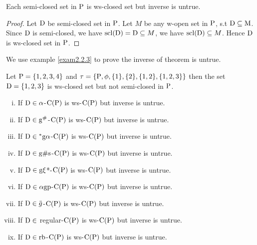 \begin{thm}\label{thm2.2.2}
Each semi-closed set in $\mathrm{P}$ is ws-closed set but inverse is untrue.
\end{thm}

\begin{proof}
Let $\mathrm{D}$ be semi-closed set in $\mathrm{P}$. Let $M$ be any w-open set in $\mathrm{P}$, s.t $\mathrm{D}\subseteq \mathrm{M}$. Since $\mathrm{D}$ is semi-closed, we have $\mathrm{scl}(\mathrm{D}) = \mathrm{D} \subseteq M$, we have  $\mathrm{scl}(\mathrm{D}) \subseteq M$.   Hence $\mathrm{D}$ is ws-closed set in $\mathrm{P}$.
\end{proof}

We use example \ref{exam2.2.3} to prove the inverse of  theorem is untrue. 

\begin{exm}\label{exam2.2.3}
Let $\mathrm{P}= \{1, 2, 3, 4\}$ and  $\tau= \{\mathrm{P}, \phi, \{1\}, \{2\},\{1, 2\}, \{1, 2, 3\}\}$ then the set $\mathrm{D}= \{1,2,3\}$ is ws-closed set but not semi-closed in $\mathrm{P}$.  
\end{exm}

\begin{thm}\label{thm2.2.4}
\begin{enumerate}[(i)]
\item If $\mathrm{D}\in\alpha$-$\mathrm{C}(\mathrm{P})$ is ws-$\mathrm{C}(\mathrm{P})$ but inverse is untrue.

\item If $\mathrm{D}\in \mathrm{g}^{\#}$-$\mathrm{C}(\mathrm{P})$ is ws-$\mathrm{C}(\mathrm{P})$ but inverse is untrue.

\item If $\mathrm{D}\in {}^{*}\mathrm{g}\alpha$-$\mathrm{C}(\mathrm{P})$ is ws-$\mathrm{C}(\mathrm{P})$ but inverse is untrue.

\item If $\mathrm{D}\in \mathrm{g}\# \mathrm{s}$-$\mathrm{C}(\mathrm{P})$ is ws-$\mathrm{C}(\mathrm{P})$ but inverse is untrue.

\item If $\mathrm{D}\in \mathrm{g}\xi$*-$\mathrm{C}(\mathrm{P})$ is ws-$\mathrm{C}(\mathrm{P})$ but inverse is untrue.

\item If $\mathrm{D}\in \alpha\mathrm{g}\mathrm{p}$-$\mathrm{C}(\mathrm{P})$ is ws-$\mathrm{C}(\mathrm{P})$ but inverse is untrue.

\item If $\mathrm{D}\in \ddot{g}$-$\mathrm{C}(\mathrm{P})$ is ws-$\mathrm{C}(\mathrm{P})$ but inverse is untrue.

\item If $\mathrm{D}\in$ regular-$\mathrm{C}(\mathrm{P})$ is ws-$\mathrm{C}(\mathrm{P})$ but inverse is untrue.

\item If $\mathrm{D}\in \mathrm{r}\mathrm{b}$-$\mathrm{C}(\mathrm{P})$ is ws-$\mathrm{C}(\mathrm{P})$ but inverse is untrue.
\end{enumerate}
\end{thm}

